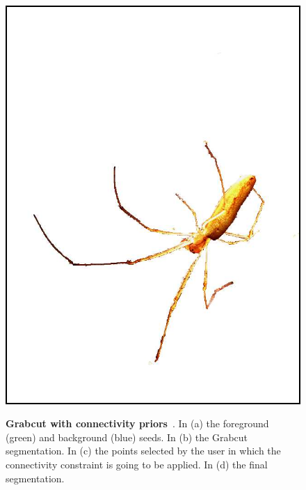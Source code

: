 \begin{figure}
{\includegraphics[scale=0.15]{figures/chapter3/grabcut-connectivity/cp-4.png}
}
\caption{\textbf{Grabcut with connectivity priors}~\cite{vicente08graph}. In (a) the foreground (green) and background (blue) seeds. In (b) the Grabcut segmentation. In (c) the points selected by the user in which the connectivity constraint is going to be applied. In (d) the final segmentation. }
\label{ch2:fig:grabcut-connectivity}
\end{figure}

